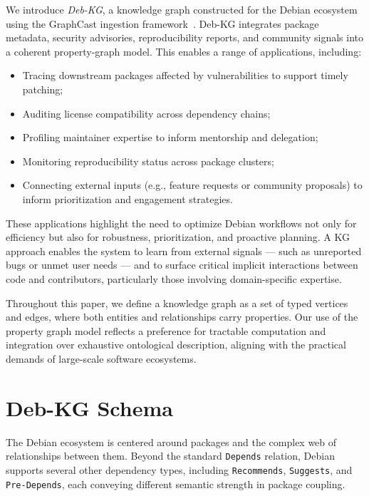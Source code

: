 \documentclass[10pt,oneside,a4paper, twocolumn]{article}
\begin{document}
    We introduce \emph{Deb-KG}, a knowledge graph constructed for the Debian ecosystem using the GraphCast ingestion framework~\cite{graphcast}.
    Deb-KG integrates package metadata, security advisories, reproducibility reports, and community signals into a coherent property-graph model.
    This enables a range of applications, including:

    \begin{itemize}
        \item Tracing downstream packages affected by vulnerabilities to support timely patching;
        \item Auditing license compatibility across dependency chains;
        \item Profiling maintainer expertise to inform mentorship and delegation;
        \item Monitoring reproducibility status across package clusters;
        \item Connecting external inputs (e.g., feature requests or community proposals) to inform prioritization and engagement strategies.
    \end{itemize}

    These applications highlight the need to optimize Debian workflows not only for efficiency but also for robustness, prioritization, and proactive planning.
    A KG approach enables the system to learn from external signals — such as unreported bugs or unmet user needs — and to surface critical implicit interactions between code and contributors, particularly those involving domain-specific expertise.

    Throughout this paper, we define a knowledge graph as a set of typed vertices and edges, where both entities and relationships carry properties.
    Our use of the property graph model reflects a preference for tractable computation and integration over exhaustive ontological description, aligning with the practical demands of large-scale software ecosystems.


    \section{Deb-KG Schema}

    The Debian ecosystem is centered around packages and the complex web of relationships between them.
    Beyond the standard \texttt{Depends} relation, Debian supports several other dependency types, including \texttt{Recommends}, \texttt{Suggests}, and \texttt{Pre-Depends}, each conveying different semantic strength in package coupling.
\end{document}
